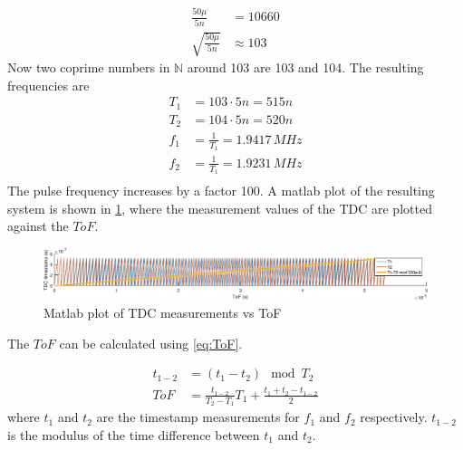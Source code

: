 \begin{align}
 	\frac{50\mu}{5n} &= 10660\\ 
 	\sqrt{\frac{50\mu}{5n}} &\approx 103
 \end{align} 
 Now two coprime numbers in $\mathbb{N}$ around 103 are 103 and 104. The resulting frequencies are
 \begin{align}
 	T_1 &= 103\cdot5n = 515n\\
 	T_2 &= 104\cdot5n = 520n\\
 	f_1 &= \frac{1}{T_1} = 1.9417\,MHz\\
 	f_2 &= \frac{1}{T_1} = 1.9231\,MHz\\
 \end{align}
The pulse frequency increases by a factor 100. A matlab plot of the resulting system is shown in \cref{fig:frequency_hopping}, where the measurement values of the TDC are plotted against the $ToF$.


\begin{figure}[h]
    \centering
    \includegraphics[width=\textwidth]{fig/frequency_hopping.eps}
    \caption{Matlab plot of TDC measurements vs ToF}
    \label{fig:frequency_hopping}
\end{figure}

The $ToF$ can be calculated using \cref{eq:ToF}.

\begin{align}
	t_{1-2} &= (t_1-t_2)\mod T_2\\
	ToF &= \frac{t_{1-2}}{T_2-T_1}T_1+\frac{t_1+t_2-t_{1-2}}{2}\label{eq:ToF}
\end{align}
where $t_1$ and $t_2$ are the timestamp measurements for $f_1$ and $f_2$ respectively. $t_{1-2}$ is the modulus of the time difference between $t_1$ and $t_2$.

